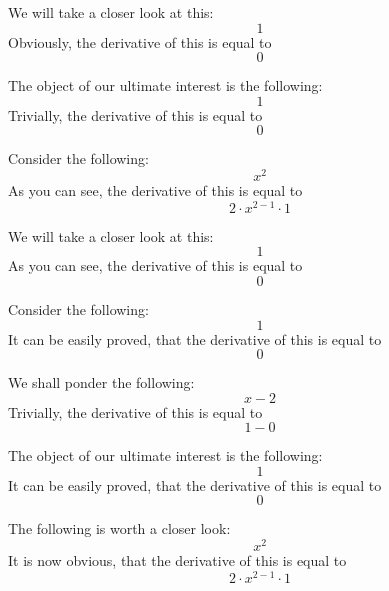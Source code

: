 \documentclass{article}
\begin{document}
We will take a closer look at this:
\begin{equation}
1 
\end{equation}
Obviously, the derivative of this is equal to
\begin{equation}
0 
\end{equation}

The object of our ultimate interest is the following:
\begin{equation}
1 
\end{equation}
Trivially, the derivative of this is equal to
\begin{equation}
0 
\end{equation}

Consider the following:
\begin{equation}
x ^{2 } 
\end{equation}
As you can see, the derivative of this is equal to
\begin{equation}
2 \cdot x ^{2 - 1 } \cdot 1 
\end{equation}

We will take a closer look at this:
\begin{equation}
1 
\end{equation}
As you can see, the derivative of this is equal to
\begin{equation}
0 
\end{equation}

Consider the following:
\begin{equation}
1 
\end{equation}
It can be easily proved, that the derivative of this is equal to
\begin{equation}
0 
\end{equation}

We shall ponder the following:
\begin{equation}
x - 2 
\end{equation}
Trivially, the derivative of this is equal to
\begin{equation}
1 - 0 
\end{equation}

The object of our ultimate interest is the following:
\begin{equation}
1 
\end{equation}
It can be easily proved, that the derivative of this is equal to
\begin{equation}
0 
\end{equation}

The following is worth a closer look:
\begin{equation}
x ^{2 } 
\end{equation}
It is now obvious, that the derivative of this is equal to
\begin{equation}
2 \cdot x ^{2 - 1 } \cdot 1 
\end{equation}
\end{document}
